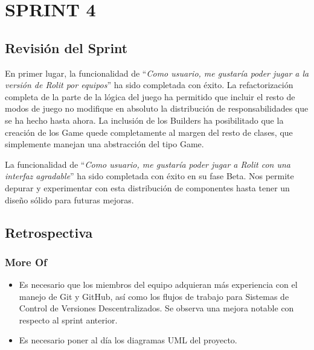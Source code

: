\documentclass[../../FINAL/Scrum/SCRUM.tex]{subfiles}
\begin{document}
\section{SPRINT 4}
\subsection{Revisión del Sprint}
En primer lugar, la funcionalidad de ``\textit{Como usuario, me gustaría poder jugar a la versión de Rolit por equipos}'' ha sido completada con éxito. La refactorización completa de la parte de la lógica del juego ha permitido que incluir el resto de modos de juego no modifique en absoluto la distribución de responsabilidades que se ha hecho hasta ahora. La inclusión de los Builders ha posibilitado que la creación de los Game quede completamente al margen del resto de clases, que simplemente manejan una abstracción del tipo Game.

La funcionalidad de ``\textit{Como usuario, me gustaría poder jugar a Rolit con una interfaz agradable}'' ha sido completada con éxito en su fase Beta. Nos permite depurar y experimentar con esta distribución de componentes hasta tener un diseño sólido para futuras mejoras.

\subsection{Retrospectiva}
\subsubsection*{More Of}
\begin{itemize}
\item Es necesario que los miembros del equipo adquieran más experiencia con el manejo de Git y GitHub, así como los flujos de trabajo para Sistemas de Control de Versiones Descentralizados. Se observa una mejora notable con respecto al sprint anterior.

\item Es necesario poner al día los diagramas UML del proyecto.

\end{itemize}
\end{document}
